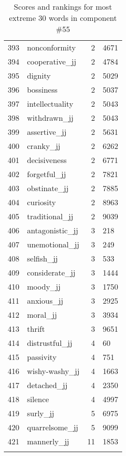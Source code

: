 \begin{longtable}[!htbp]{| rlr@{.}l |}
    393 & nonconformity & 2 & 4671 \\
    394 & cooperative\_jj & 2 & 4784 \\
    395 & dignity & 2 & 5029 \\
    396 & bossiness & 2 & 5037 \\
    397 & intellectuality & 2 & 5043 \\
    398 & withdrawn\_jj & 2 & 5043 \\
    399 & assertive\_jj & 2 & 5631 \\
    400 & cranky\_jj & 2 & 6262 \\
    401 & decisiveness & 2 & 6771 \\
    402 & forgetful\_jj & 2 & 7821 \\
    403 & obstinate\_jj & 2 & 7885 \\
    404 & curiosity & 2 & 8963 \\
    405 & traditional\_jj & 2 & 9039 \\
    406 & antagonistic\_jj & 3 & 218 \\
    407 & unemotional\_jj & 3 & 249 \\
    408 & selfish\_jj & 3 & 533 \\
    409 & considerate\_jj & 3 & 1444 \\
    410 & moody\_jj & 3 & 1750 \\
    411 & anxious\_jj & 3 & 2925 \\
    412 & moral\_jj & 3 & 3934 \\
    413 & thrift & 3 & 9651 \\
    414 & distrustful\_jj & 4 & 60 \\
    415 & passivity & 4 & 751 \\
    416 & wishy-washy\_jj & 4 & 1663 \\
    417 & detached\_jj & 4 & 2350 \\
    418 & silence & 4 & 4997 \\
    419 & surly\_jj & 5 & 6975 \\
    420 & quarrelsome\_jj & 5 & 9099 \\
    421 & mannerly\_jj & 11 & 1853 \\
    \hline
    \caption{Scores and rankings for most extreme 30 words in component \#55} \\
\end{longtable}
